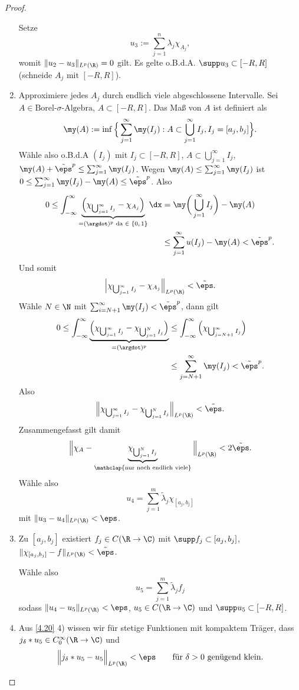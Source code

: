 \begin{st}
\begin{proof}
\begin{enumerate}[1)]
				Setze 
				\[
					u_3 := \sum_{j=1}^n \lambda_j \chi_{A_j},
				\]
				womit $\|u_2 - u_3\|_{L^p(\R)} = 0$ gilt.
				Es gelte o.B.d.A. $\supp u_3 \subset [-R,R]$ (schneide $A_j$ mit $[-R,R]$).
			\item
				Approximiere jedes $A_j$ durch endlich viele abgeschlossene Intervalle.
				Sei $A \in \text{Borel-$\sigma$-Algebra}$, $A \subset [-R,R]$.
				Das Maß von $A$ ist definiert als
				\[
					\my(A) := \inf \Big\{ \sum_{j=1}^\infty \my(I_j) : A \subset \bigcup_{j=1}^\infty I_j, I_j = [a_j, b_j] \Big\}.
				\]
				Wähle also o.B.d.A $(I_j)$ mit $I_j \subset [-R,R]$, $A \subset \bigcup_{j=1}^\infty I_j$, $\my(A) + \tilde \eps^p \le \sum_{j=1}^\infty \my(I_j)$.
				Wegen $\my(A) \le \sum_{j=1}^\infty \my(I_j)$ ist $0 \le \sum_{j=1}^\infty \my(I_j) - \my(A) \le \tilde \eps^p$.
				Also
				\begin{align*}
					0 
					\le \int_{-\infty}^\infty \underbrace{\Big(\chi_{\bigcup_{j=1}^\infty I_j} - \chi_{A_j}\Big)}_{=(\argdot)^p \text{ da $\in \{0,1\}$}} \dx
					&= \my\bigg(\bigcup_{j=1}^\infty I_j \bigg) - \my(A) \\
					&\le \sum_{j=1}^\infty u(I_j) - \my(A)
					< \tilde \eps^p.
				\end{align*}
				Und somit
				\[
					\Big|\chi_{\bigcup_{j=1}^\infty I_j} - \chi_{A_j}\Big\|_{L^p(\R)} < \tilde \eps.
				\]
				Wähle $N \in \N$ mit $\sum_{i=N+1}^\infty \my(I_j) < \tilde \eps^p$, dann gilt
				\begin{align*}
					0 
					\le \int_{-\infty}^\infty \underbrace{\Big(\chi_{\bigcup_{j=1}^\infty I_j} - \chi_{\bigcup_{j=1}^N I_j}\Big)}_{=(\argdot)^p}
					&\le \int_{-\infty}^\infty \Big(\chi_{\bigcup_{j=N+1}^\infty I_j}\Big) \\
					&\le \sum_{j=N+1}^\infty \my(I_j) 
					< \tilde \eps^p.
				\end{align*}
				Also
				\[
					\Big\| \chi_{\bigcup_{j=1}^\infty I_j} - \chi_{\bigcup_{j=1}^N I_j} \Big\|_{L^p(\R)} < \tilde \eps.
				\]
				Zusammengefasst gilt damit
				\[
					\Big\| \chi_A - \underbrace{\chi_{\bigcup_{j=1}^N I_j}}_{\mathclap{\text{nur noch endlich viele}}} \Big\|_{L^p(\R)} < 2 \tilde \eps.
				\]
				Wähle also
				\[
					u_4 = \sum_{j=1}^m  \tilde \lambda_j \chi_{[a_j,b_j]}
				\]
				mit $\|u_3 - u_4\|_{L^p(\R)} < \eps$.
			\item
				Zu $[a_j,b_j]$ existiert $f_j \in C(\R \to \C)$ mit $\supp f_j \subset [a_j, b_j]$, $\|\chi_{[a_j,b_j]} - f\|_{L^p(\R)} < \tilde \eps$.

				Wähle also
				\[
					u_5 = \sum_{j=1}^m \tilde \lambda_j f_j
				\]
				sodass $\|u_4 - u_5\|_{L^p(\R)} < \eps$, $u_5 \in C(\R \to \C)$ und $\supp u_5 \subset [-R,R]$.
			\item
				Aus \ref{4.20} 4) wissen wir für stetige Funktionen mit kompaktem Träger, dass $j_\delta \ast u_5 \in C_0^\infty(\R \to \C)$ und
				\[
					\Big\|j_\delta \ast u_5 - u_5 \Big\|_{L^p(\R)} < \eps \qquad \text{für $\delta > 0$ genügend klein.}
				\]


\end{enumerate}
\end{proof}
\end{st}
